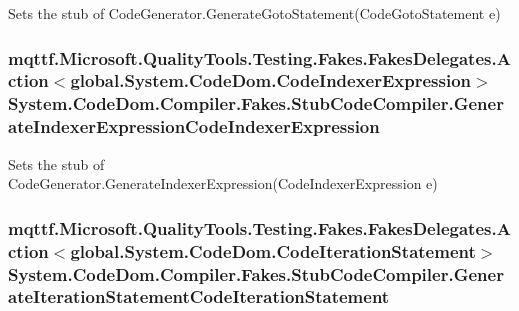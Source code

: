 Sets the stub of Code\-Generator.\-Generate\-Goto\-Statement(\-Code\-Goto\-Statement e)

\hypertarget{class_system_1_1_code_dom_1_1_compiler_1_1_fakes_1_1_stub_code_compiler_a229dfdccddb7932ef3bccc594d5e10c5}{
\subsubsection[{Generate\-Indexer\-Expression\-Code\-Indexer\-Expression}]{\setlength{\rightskip}{0pt plus 5cm}mqttf.\-Microsoft.\-Quality\-Tools.\-Testing.\-Fakes.\-Fakes\-Delegates.\-Action$<$global.\-System.\-Code\-Dom.\-Code\-Indexer\-Expression$>$ System.\-Code\-Dom.\-Compiler.\-Fakes.\-Stub\-Code\-Compiler.\-Generate\-Indexer\-Expression\-Code\-Indexer\-Expression}}\label{class_system_1_1_code_dom_1_1_compiler_1_1_fakes_1_1_stub_code_compiler_a229dfdccddb7932ef3bccc594d5e10c5}


Sets the stub of Code\-Generator.\-Generate\-Indexer\-Expression(\-Code\-Indexer\-Expression e)

\hypertarget{class_system_1_1_code_dom_1_1_compiler_1_1_fakes_1_1_stub_code_compiler_a6367e7033e1ad0457399221ecbcfe746}{
\subsubsection[{Generate\-Iteration\-Statement\-Code\-Iteration\-Statement}]{\setlength{\rightskip}{0pt plus 5cm}mqttf.\-Microsoft.\-Quality\-Tools.\-Testing.\-Fakes.\-Fakes\-Delegates.\-Action$<$global.\-System.\-Code\-Dom.\-Code\-Iteration\-Statement$>$ System.\-Code\-Dom.\-Compiler.\-Fakes.\-Stub\-Code\-Compiler.\-Generate\-Iteration\-Statement\-Code\-Iteration\-Statement}}\label{class_system_1_1_code_dom_1_1_compiler_1_1_fakes_1_1_stub_code_compiler_a6367e7033e1ad0457399221ecbcfe746}


